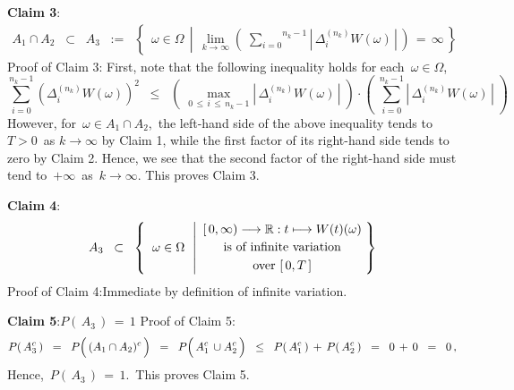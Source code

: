\vskip 0.5cm
\noindent
\textbf{Claim 3}:\quad
\begin{eqnarray*}
A_{1} \cap A_{2}
\;\; \subset \;\;
A_{3}
\;\; := \;\;
	\left\{\;\,
		\omega \in \Omega
		\;\,\left\vert\;\,
		\underset{k\rightarrow\infty}{\lim}
			\left(\;
				\overset{n_{k}-1}{\underset{i=0}{\sum}}
				\left\vert\,\Delta^{(n_{k})}_{i}W(\omega)\,\right\vert
				\,\right)
		\, = \, \infty
		\right.
		\,\right\}
\end{eqnarray*}
Proof of Claim 3:\quad
First, note that the following inequality holds for each \,$\omega \in \Omega$,
\begin{equation*}
\overset{n_{k}-1}{\underset{i=0}{\sum}}\left(\Delta^{(n_{k})}_{i}W(\omega)\right)^{2}
\;\; \leq \;\;
	\left(\;\underset{0\,\leq\,i\,\leq\,n_{k}-1}{\max}\left\vert\,\Delta^{(n_{k})}_{i}W(\omega)\,\right\vert\;\right)
	\cdot
	\left(\;\overset{n_{k}-1}{\underset{i=0}{\sum}}\left\vert\,\Delta^{(n_{k})}_{i}W(\omega)\,\right\vert\;\right)
\end{equation*}
However, for \,$\omega \in A_{1} \cap A_{2}$,\, the left-hand side of the above inequality
tends to \,$T > 0$\, as $k \longrightarrow \infty$ by Claim 1,
while the first factor of its right-hand side tends to zero by Claim 2.
Hence, we see that the second factor of the right-hand side must tend to \,$+\infty$\,
as \,$k \longrightarrow \infty$. This proves Claim 3.

\vskip 0.5cm
\noindent
\textbf{Claim 4}:\quad
\begin{eqnarray*}
A_{3}
\;\; \subset \;\;
	\left\{\;\;
		\omega \in \Omega
		\,\;\left\vert
		\begin{array}{c}
			[\,0,\infty) \longrightarrow \Re : t \longmapsto W(t)(\omega)
			\\
			\overset{{\color{white}.}}{\textnormal{is of infinite variation}}
			\\
			\overset{{\color{white}.}}{\textnormal{over $[\,0,T\,]$}}
			\end{array}
			\right.
		\!\!\right\}
\end{eqnarray*}
Proof of Claim 4:\quad Immediate by definition of infinite variation.

\vskip 0.5cm
\noindent
\textbf{Claim 5}:\quad $P(\,A_{3}\,) \,=\, 1$
\vskip 0.2cm
\noindent
Proof of Claim 5:\quad
\begin{equation*}
P(\,A_{3}^{c}\,)
\;\; = \;\;
	P\!\left(\,(A_{1} \overset{{\color{white}.}}{\cap} A_{2})^{c}\,\right)
\;\; = \;\;
	P\!\left(\, A_{1}^{c} \,\overset{{\color{white}.}}{\cup} A_{2}^{c} \,\right)
\;\; \leq \;\;
	P\!\left(\, A_{1}^{c} \,\right)
	\, + \,
	P\!\left(\, A_{2}^{c} \,\right)
\;\; = \;\;
	0 \,+\, 0
\;\; = \;\;
	0\,,
\end{equation*}
Hence, \,$P(\,A_{3}\,) \,=\, 1$.\, This proves Claim 5.

